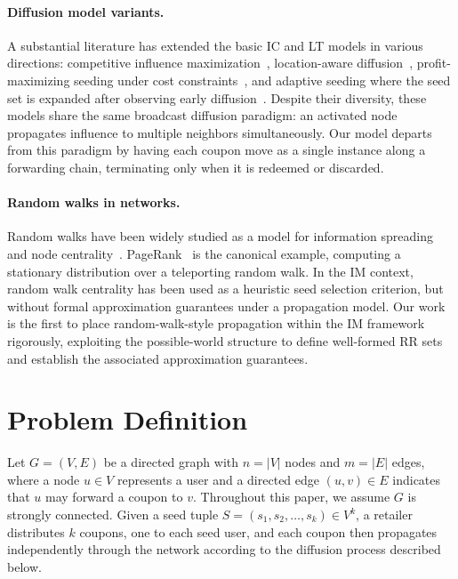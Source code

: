 \documentclass[sigconf]{acmart}
\begin{document}
\paragraph{Diffusion model variants.}
A substantial literature has extended the basic IC and LT models in various directions: competitive influence maximization~\cite{budak2011limiting}, location-aware diffusion~\cite{li2014efficient}, profit-maximizing seeding under cost constraints~\cite{lu2015competition}, and adaptive seeding where the seed set is expanded after observing early diffusion~\cite{seeman2013adaptive}. Despite their diversity, these models share the same broadcast diffusion paradigm: an activated node propagates influence to multiple neighbors simultaneously. Our model departs from this paradigm by having each coupon move as a single instance along a forwarding chain, terminating only when it is redeemed or discarded.

\paragraph{Random walks in networks.}
Random walks have been widely studied as a model for information spreading and node centrality~\cite{lovasz1993random}. PageRank~\cite{page1999pagerank} is the canonical example, computing a stationary distribution over a teleporting random walk. In the IM context, random walk centrality has been used as a heuristic seed selection criterion, but without formal approximation guarantees under a propagation model. Our work is the first to place random-walk-style propagation within the IM framework rigorously, exploiting the possible-world structure to define well-formed RR sets and establish the associated approximation guarantees.

\section{Problem Definition}

Let $G = (V, E)$ be a directed graph with $n = |V|$ nodes and $m = |E|$ edges, where a node $u \in V$ represents a user and a directed edge $(u, v) \in E$ indicates that $u$ may forward a coupon to $v$. Throughout this paper, we assume $G$ is strongly connected. Given a seed tuple $S = (s_1, s_2, \ldots, s_k) \in V^k$, a retailer distributes $k$ coupons, one to each seed user, and each coupon then propagates independently through the network according to the diffusion process described below.
\end{document}
